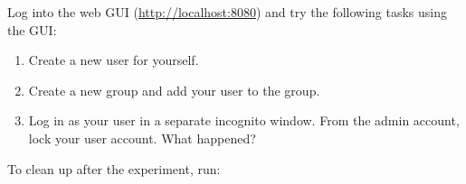 Log into the web GUI (\href{http://localhost:8080}{http://localhost:8080}) and try the following tasks using the GUI:

\begin{enumerate}
\item
  Create a new user for yourself.
\item
  Create a new group and add your user to the group.
\item
  Log in as your user in a separate incognito window. From the admin
  account, lock your user account. What happened?
\end{enumerate}

To clean up after the experiment, run:

